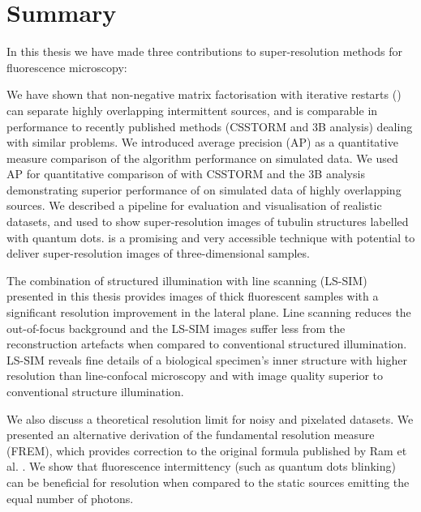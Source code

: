 \chapter{Summary\label{ch:Summary}}

In this thesis we have made three contributions to super-resolution methods for fluorescence microscopy:

We have shown that non-negative matrix factorisation with iterative restarts (\inmf{}) can separate highly overlapping intermittent sources,
and is comparable in performance to recently published methods (CSSTORM and 3B analysis) dealing with similar problems. We introduced average precision (AP) as a quantitative measure comparison of the algorithm performance on simulated data. We used AP for quantitative comparison of \inmf{} with CSSTORM and the 3B analysis demonstrating superior performance of \inmf{} on simulated data of highly overlapping sources. We described a pipeline for evaluation and visualisation of realistic datasets, and used \inmf{} to show super-resolution images of tubulin structures labelled with quantum dots. \inmf{} is a promising and very accessible technique with potential to deliver super-resolution images of three-dimensional samples.

The combination of structured illumination with line scanning (LS-SIM) presented in this thesis provides images of thick fluorescent samples with a significant resolution improvement in the lateral plane. Line scanning reduces the out-of-focus background and the LS-SIM images suffer less from the reconstruction artefacts when compared to conventional structured illumination. LS-SIM reveals fine details of a biological specimen's inner structure with higher resolution than line-confocal microscopy and with image quality superior to conventional structure illumination.

We also discuss a theoretical resolution limit for noisy and pixelated datasets. We presented an alternative derivation of the fundamental resolution measure (FREM), which provides correction to the original formula published by Ram et al. \cite{Ram2006}. We show that fluorescence intermittency (such as quantum dots blinking) can be beneficial for resolution when compared to the static sources emitting the equal number of photons.